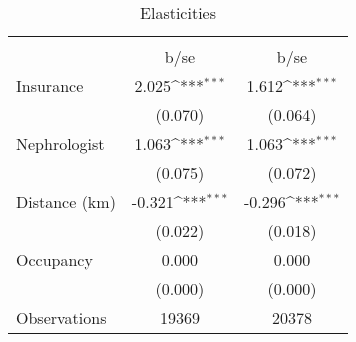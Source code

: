 \begin{table}[htbp]\centering
\def\sym#1{\ifmmode^{#1}\else\(^{#1}\)\fi}
\caption{Elasticities}
\begin{tabular}{l*{2}{c}}
\toprule
                    &\multicolumn{1}{c}{} &\multicolumn{1}{c}{} \\
                    &        b/se         &        b/se         \\
\midrule
Insurance           &       2.025\sym{***}&       1.612\sym{***}\\
                    &     (0.070)         &     (0.064)         \\
Nephrologist        &       1.063\sym{***}&       1.063\sym{***}\\
                    &     (0.075)         &     (0.072)         \\
Distance (km)       &      -0.321\sym{***}&      -0.296\sym{***}\\
                    &     (0.022)         &     (0.018)         \\
Occupancy           &       0.000         &       0.000         \\
                    &     (0.000)         &     (0.000)         \\
\midrule
Observations        &       19369         &       20378         \\
\bottomrule
\end{tabular}
\end{table}
